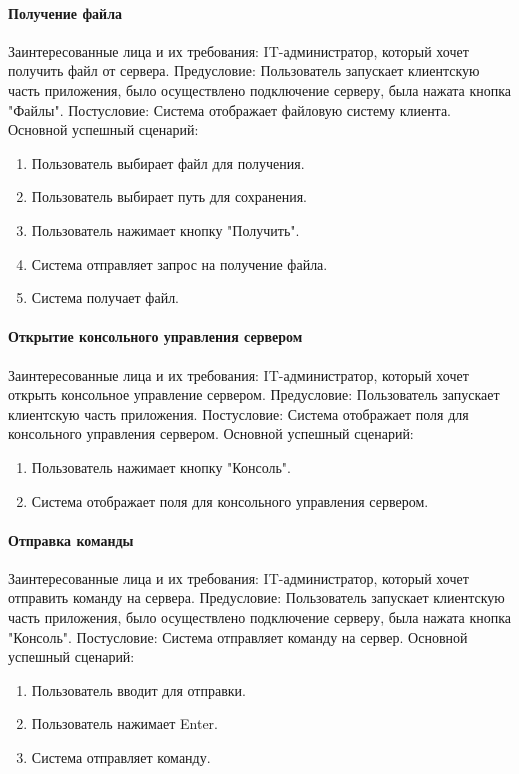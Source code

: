 \paragraph{Получение файла}
Заинтересованные лица и их требования: IT-администратор, который хочет получить файл от сервера.
Предусловие: Пользователь запускает клиентскую часть приложения,  было осуществлено подключение серверу, была нажата кнопка "Файлы".
Постусловие: Система отображает файловую систему клиента.
Основной успешный сценарий:
\begin{enumerate}
	\item Пользователь выбирает файл для получения.
	\item Пользователь выбирает путь для сохранения.
	\item Пользователь нажимает кнопку "Получить".
	\item Система отправляет запрос на получение файла.
	\item Система получает файл.
\end{enumerate}

\paragraph{Открытие консольного управления сервером}
Заинтересованные лица и их требования: IT-администратор, который хочет открыть консольное управление сервером.
Предусловие: Пользователь запускает клиентскую часть приложения.
Постусловие: Система отображает поля для консольного управления сервером.
Основной успешный сценарий:
\begin{enumerate}
	\item Пользователь нажимает кнопку "Консоль".
	\item  Система отображает поля для консольного управления сервером.
\end{enumerate}

\paragraph{Отправка команды}
Заинтересованные лица и их требования: IT-администратор, который хочет отправить команду на сервера.
Предусловие: Пользователь запускает клиентскую часть приложения,  было осуществлено подключение серверу, была нажата кнопка "Консоль".
Постусловие: Система отправляет команду на сервер.
Основной успешный сценарий:
\begin{enumerate}
	\item Пользователь вводит для отправки.
	\item Пользователь нажимает Enter.
	\item Система отправляет команду.
\end{enumerate}

